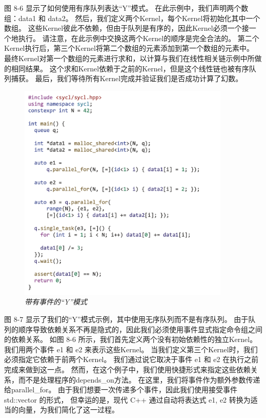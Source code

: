 图 8-6 显示了如何使用有序队列表达“Y”模式。 在此示例中，我们声明两个数组：data1 和 data2。 
然后，我们定义两个Kernel，每个Kernel将初始化其中一个数组。 
这些Kernel彼此不依赖，但由于队列是有序的，因此Kernel必须一个接一个地执行。 
请注意，在此示例中交换这两个Kernel的顺序是完全合法的。 
第二个Kernel执行后，第三个Kernel将第二个数组的元素添加到第一个数组的元素中。 
最终Kernel对第一个数组的元素进行求和，以计算与我们在线性相关链示例中所做的相同结果。 
这个求和Kernel依赖于之前的Kernel，但是这个线性链也被有序队列捕获。 
最后，我们等待所有Kernel完成并验证我们是否成功计算了幻数。

\begin{figure}[H]
	\centering
	\includegraphics[width=0.9\textwidth]{figs/F8.7.png}
	\caption{\textit{带有事件的“Y”模式 }}
\end{figure}

图 8-7 显示了我们的“Y”模式示例，其中使用无序队列而不是有序队列。 
由于队列的顺序导致依赖关系不再是隐式的，因此我们必须使用事件显式指定命令组之间的依赖关系。 
如图 8-6 所示，我们首先定义两个没有初始依赖性的独立Kernel。 我们用两个事件 e1 和 e2 来表示这些Kernel。 
当我们定义第三个Kernel时，我们必须指定它依赖于前两个Kernel。 
我们通过说它取决于事件 e1 和 e2 在执行之前完成来做到这一点。 
然而，在这个例子中，我们使用快捷形式来指定这些依赖关系，而不是处理程序的depends\_on方法。 
在这里，我们将事件作为额外参数传递给parallel\_for。 
由于我们想要一次传递多个事件，因此我们使用接受事件 std::vector 的形式，
但幸运的是，现代 C++ 通过自动将表达式 {e1, e2} 转换为适当的向量，为我们简化了这一过程。

